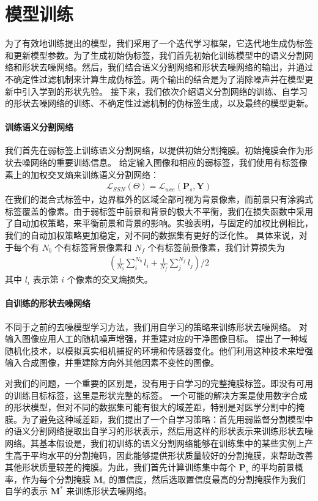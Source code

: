 \section{模型训练}
为了有效地训练提出的模型，我们采用了一个迭代学习框架，它迭代地生成伪标签和更新模型参数。为了生成初始伪标签，我们首先初始化训练模型中的语义分割网络和形状去噪网络。然后，我们结合语义分割网络和形状去噪网络的输出，并通过不确定性过滤机制来计算生成伪标签。两个输出的结合是为了消除噪声并在模型更新中引入学到的形状先验。
接下来，我们依次介绍语义分割网络的训练、自学习的形状去噪网络的训练、不确定性过滤机制的伪标签生成，以及最终的模型更新。

\paragraph{训练语义分割网络}
我们首先在弱标签上训练语义分割网络，以提供初始分割掩膜。初始掩膜会作为形状去噪网络的重要训练信息。
给定输入图像和相应的弱标签，我们使用有标签像素上的加权交叉熵来训练语义分割网络：
\begin{align}
    \mathcal{L}_{SSN} (\Theta) = \mathcal{L}_{wce} (\mathbf{P}_s, \mathbf{Y})
\end{align}
在我们的混合式标签中，边界框外的区域全部可视为背景像素，而前景只有涂鸦式标签覆盖的像素。由于弱标签中前景和背景的极大不平衡，我们在损失函数中采用了自动加权策略，来平衡前景和背景的影响。实验表明，与固定的加权比例相比，我们的自动加权策略更加稳定，对不同的数据集有更好的泛化性。
具体来说，对于每个有 $N_b$ 个有标签背景像素和 $N_f$ 个有标签前景像素，我们计算损失为
\begin{align}
    (\frac{1}{N_b} \sum^{N_b}_{i} l_i + \frac{1}{N_f} \sum^{N_f}_{j} l_j) / 2
\end{align}
其中 $l_i$ 表示第 $i$ 个像素的交叉熵损失。

\paragraph{自训练的形状去噪网络}
不同于之前的去噪模型学习方法，我们用自学习的策略来训练形状去噪网络。\citet{vincent2010stacked} 对输入图像应用人工的随机噪声增强，并重建对应的干净图像目标。\citet{Sundermeyer_2018_ECCV} 提出了一种域随机化技术，以模拟真实相机捕捉的环境和传感器变化。他们利用这种技术来增强输入合成图像，并重建除方向外其他因素不变性的图像。

对我们的问题，一个重要的区别是，没有用于自学习的完整掩膜标签。即没有可用的训练目标标签，这里是形状完整的标签。
一个可能的解决方案是使用数字合成的形状模型，但对不同的数据集可能有很大的域差距，特别是对医学分割中的掩膜。为了避免这种域差距，我们提出了一个自学习策略：首先用弱监督分割模型中的语义分割网络提取出自学习的形状表示，然后用这样的形状表示来训练形状去噪网络。其基本假设是，我们初训练的语义分割网络能够在训练集中的某些实例上产生高于平均水平的分割掩码，因此能够提供形状质量较好的分割掩膜，来帮助改善其他形状质量较差的掩膜。为此，我们首先计算训练集中每个 $\mathbf{P}_s$ 的平均前景概率，作为每个分割掩膜 $\mathbf{M}_s$ 的置信度，然后选取置信度最高的分割掩膜作为我们自学的表示 $\mathbf{M}^*$ 来训练形状去噪网络。

